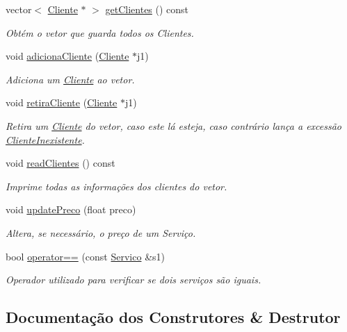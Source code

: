 \begin{DoxyCompactItemize}
vector$<$ \hyperlink{class_cliente}{Cliente} $\ast$ $>$ \hyperlink{class_servico_a3e6faedd16eb2027986b032c1fe601ce}{get\+Clientes} () const 
\begin{DoxyCompactList}\small\item\em Obtém o vetor que guarda todos os Clientes. \end{DoxyCompactList}\item 
void \hyperlink{class_servico_a230392fbbe40d5d4cb5198f65ba26cd5}{adiciona\+Cliente} (\hyperlink{class_cliente}{Cliente} $\ast$j1)
\begin{DoxyCompactList}\small\item\em Adiciona um \hyperlink{class_cliente}{Cliente} ao vetor. \end{DoxyCompactList}\item 
void \hyperlink{class_servico_ab6fedbc606ac14cd7181be469d763e91}{retira\+Cliente} (\hyperlink{class_cliente}{Cliente} $\ast$j1)
\begin{DoxyCompactList}\small\item\em Retira um \hyperlink{class_cliente}{Cliente} do vetor, caso este lá esteja, caso contrário lança a excessão \hyperlink{class_cliente_inexistente}{Cliente\+Inexistente}. \end{DoxyCompactList}\item 
void \hyperlink{class_servico_a98156d44790f7aa46e9af802a5c54f2d}{read\+Clientes} () const 
\begin{DoxyCompactList}\small\item\em Imprime todas as informações dos clientes do vetor. \end{DoxyCompactList}\item 
void \hyperlink{class_servico_a596e378b994c4033d12e180129316f4b}{update\+Preco} (float preco)
\begin{DoxyCompactList}\small\item\em Altera, se necessário, o preço de um Serviço. \end{DoxyCompactList}\item 
bool \hyperlink{class_servico_a3b5df4e06c2e553584762c9047fc470f}{operator==} (const \hyperlink{class_servico}{Servico} \&s1)
\begin{DoxyCompactList}\small\item\em Operador utilizado para verificar se dois serviços são iguais. \end{DoxyCompactList}\end{DoxyCompactItemize}


\subsection{Documentação dos Construtores \& Destrutor}
\hypertarget{class_servico_ad6f73e597087d194f6a768f5b49174a4}{}
